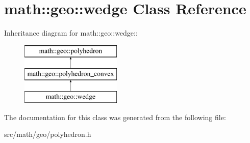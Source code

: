 \hypertarget{classmath_1_1geo_1_1wedge}{
\section{math::geo::wedge Class Reference}
\label{classmath_1_1geo_1_1wedge}
}
Inheritance diagram for math::geo::wedge::\begin{figure}[H]
\begin{center}
\leavevmode
\includegraphics[height=3cm]{classmath_1_1geo_1_1wedge}
\end{center}
\end{figure}


The documentation for this class was generated from the following file:\begin{DoxyCompactItemize}
\item 
src/math/geo/polyhedron.h\end{DoxyCompactItemize}
